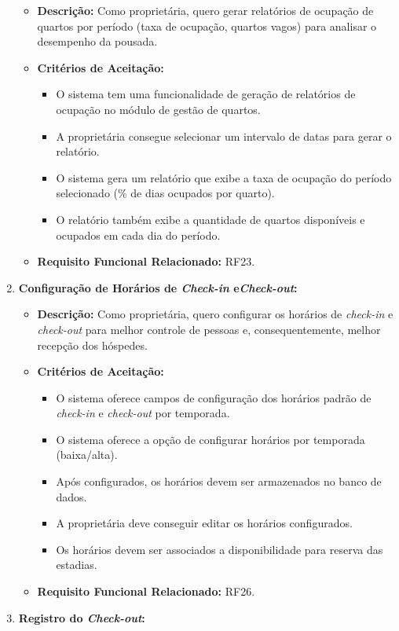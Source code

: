 \documentclass[
	12pt,				%
	openany,			%
	oneside,			%
	a4paper,			%
	english,			%
	french,				%
	spanish,			%
	brazil				%
	]{abntex2}
\begin{document}
\begin{enumerate}[label=\textbf{\arabic*.}]
\begin{itemize}
		\item \textbf{Descrição:} Como proprietária, quero gerar relatórios de ocupação de quartos por período (taxa de ocupação, quartos vagos) para analisar o desempenho da pousada.
		\item \textbf{Critérios de Aceitação:}
		\begin{itemize}
			\item O sistema tem uma funcionalidade de geração de relatórios de ocupação no módulo de gestão de quartos.
			\item A proprietária consegue selecionar um intervalo de datas para gerar o relatório.
			\item O sistema gera um relatório que exibe a taxa de ocupação do período selecionado (\% de dias ocupados por quarto).
			\item O relatório também exibe a quantidade de quartos disponíveis e ocupados em cada dia do período.
		\end{itemize}
		\item \textbf{Requisito Funcional Relacionado:} RF23.
	\end{itemize} 
	\item \textbf{Configuração de Horários de \textit{Check-in} e\textit{Check-out}:}
	\begin{itemize}
		\item \textbf{Descrição:}  Como proprietária, quero configurar os horários de \textit{check-in} e \textit{check-out} para melhor controle de pessoas e, consequentemente, melhor recepção dos hóspedes.
		\item \textbf{Critérios de Aceitação:}
		\begin{itemize}
			\item O sistema oferece campos de configuração dos horários padrão de \textit{check-in} e \textit{check-out} por temporada.
			\item O sistema oferece a opção de configurar horários por temporada (baixa/alta). 
			\item Após configurados, os horários devem ser armazenados no banco de dados.
			\item A proprietária deve conseguir editar os horários configurados.
			\item Os horários devem ser associados a disponibilidade para reserva das estadias.
		\end{itemize}
		\item \textbf{Requisito Funcional Relacionado:} RF26.
	\end{itemize} 
	\item \textbf{Registro do \textit{Check-out}:}

\end{enumerate}
\end{document}

